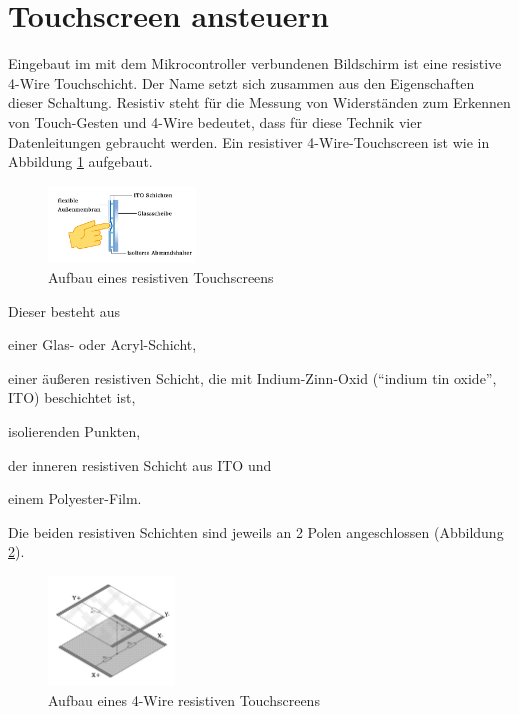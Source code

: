 \section{\ExercisePrefixEmbeddedC Touchscreen ansteuern \optional}
Eingebaut im mit dem Mikrocontroller verbundenen Bildschirm ist eine resistive 4-Wire Touchschicht.
Der Name setzt sich zusammen aus den Eigenschaften dieser Schaltung.
Resistiv steht für die Messung von Widerständen zum Erkennen von Touch-Gesten und 4-Wire bedeutet, dass für diese Technik vier Datenleitungen gebraucht werden.
Ein resistiver 4-Wire-Touchscreen ist wie in Abbildung \ref{fig:rsTouch} aufgebaut.

\begin{figure}[!htb]
    \centering
    \includegraphics[width=0.35\textwidth]{./05_c/figures/4WireRSTouch.png}
    \caption{Aufbau eines resistiven Touchscreens}
    \label{fig:rsTouch}
\end{figure}

Dieser besteht aus
\begin{inparaenum}
\item
einer Glas- oder Acryl-Schicht,
\item 
einer äußeren resistiven Schicht, die mit Indium-Zinn-Oxid (\enquote{indium tin oxide}, ITO) beschichtet ist,
\item 
isolierenden Punkten,
\item 
der inneren resistiven Schicht aus ITO und 
\item
einem Polyester-Film.
\end{inparaenum}
Die beiden resistiven Schichten sind jeweils an 2 Polen angeschlossen (Abbildung \ref{fig:fourRSTouch}).

\begin{figure}[!htb]
    \centering
    \includegraphics[width=0.3\textwidth]{./05_c/figures/ResistiveTS.png}
    \caption{Aufbau eines 4-Wire resistiven Touchscreens }
    \label{fig:fourRSTouch}
\end{figure} 

